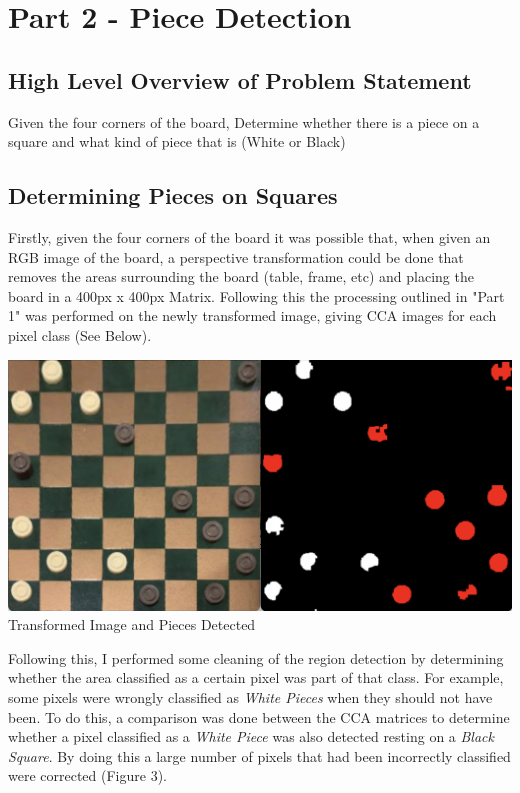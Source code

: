 \documentclass[12pt]{article}
\begin{document}
    \newpage
    \section{Part 2 - Piece Detection}
    \subsection{High Level Overview of Problem Statement}
    \par
    Given the four corners of the board, Determine whether there is a piece on a square and what kind of piece that is (White or Black)

    \subsection{Determining Pieces on Squares}
    \par
    Firstly, given the four corners of the board it was possible that, when given an RGB image of the board, a perspective transformation could be done that removes the areas surrounding the board (table, frame, etc) and placing the board in a 400px x 400px Matrix. Following this the processing outlined in "Part 1" was
    performed on the newly transformed image, giving CCA images for each pixel class (See Below).
    \begin{center}
        \includegraphics[scale=0.25]{TransformedAndPieces.png}
        \newline
        Transformed Image and Pieces Detected
    \end{center}
    \par
    Following this, I performed some cleaning of the region detection by determining whether the area classified as a certain pixel was part of that class. For example, some pixels were wrongly classified as \emph{White Pieces} when they should not have been. To do this, a 
    comparison was done between the CCA matrices to determine whether a pixel classified as a \emph{White Piece} was also detected resting on a \emph{Black Square}. By doing this a large number of pixels that had been incorrectly classified were corrected (Figure 3).
\end{document}
